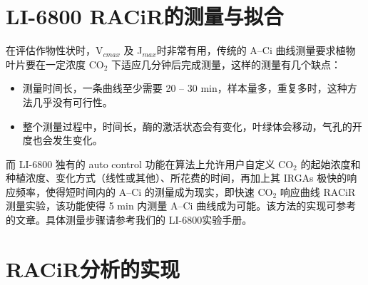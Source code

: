 \documentclass[]{krantz}
\makeatletter
\newenvironment{Shaded}{\begin{snugshade}}{\end{snugshade}}
\newcommand{\StringTok}[1]{\textcolor[rgb]{0.31,0.60,0.02}{#1}}
\newcommand{\OperatorTok}[1]{\textcolor[rgb]{0.81,0.36,0.00}{\textbf{#1}}}
\newcommand{\NormalTok}[1]{#1}
\providecommand{\tightlist}{%
  \setlength{\itemsep}{0pt}\setlength{\parskip}{0pt}}
\newenvironment{kframe}{%
\medskip{}
\setlength{\fboxsep}{.8em}
 \def\at@end@of@kframe{}%
 \ifinner\ifhmode%
  \def\at@end@of@kframe{\end{minipage}}%
  \begin{minipage}{\columnwidth}%
 \fi\fi%
 \def\FrameCommand##1{\hskip\@totalleftmargin \hskip-\fboxsep
 \colorbox{shadecolor}{##1}\hskip-\fboxsep
     \hskip-\linewidth \hskip-\@totalleftmargin \hskip\columnwidth}%
 \MakeFramed {\advance\hsize-\width
   \@totalleftmargin\z@ \linewidth\hsize
   \@setminipage}}%
 {\par\unskip\endMakeFramed%
 \at@end@of@kframe}
\renewenvironment{Shaded}{\begin{kframe}}{\end{kframe}}
\theoremstyle{definition}
\theoremstyle{definition}
\theoremstyle{definition}
\theoremstyle{remark}
\makeatother
\begin{document}
\begin{Shaded}
\end{Shaded}

\section{\texorpdfstring{LI-6800
RACiR\texttrademark 的测量与拟合}{LI-6800 RACiR的测量与拟合}}\label{racir68}

在评估作物性状时，V\(_{cmax}\) 及 J\(_{max}\)时非常有用，传统的 A--Ci
曲线测量要求植物叶片要在一定浓度 CO\(_{2}\)
下适应几分钟后完成测量，这样的测量有几个缺点：

\begin{itemize}
\tightlist
\item
  测量时间长，一条曲线至少需要 20 -- 30
  min，样本量多，重复多时，这种方法几乎没有可行性。
\item
  整个测量过程中，时间长，酶的激活状态会有变化，叶绿体会移动，气孔的开度也会发生变化。
\end{itemize}

而 LI-6800 独有的 auto control 功能在算法上允许用户自定义 CO\(_{2}\)
的起始浓度和种植浓度、变化方式（线性或其他）、所花费的时间，再加上其
IRGAs 极快的响应频率，使得短时间内的 A--Ci 的测量成为现实，即快速
CO\(_{2}\) 响应曲线 RACiR\texttrademark
测量实验，该功能使得 5 min 内测量 A--Ci 曲线成为可能。该方法的实现可参考
\citet{Stinziano2017} 的文章。具体测量步骤请参考我们的 LI-6800实验手册。

\section{\texorpdfstring{RACiR\texttrademark 分析的实现}{RACiR分析的实现}}\label{racir68_exam}
\end{document}
